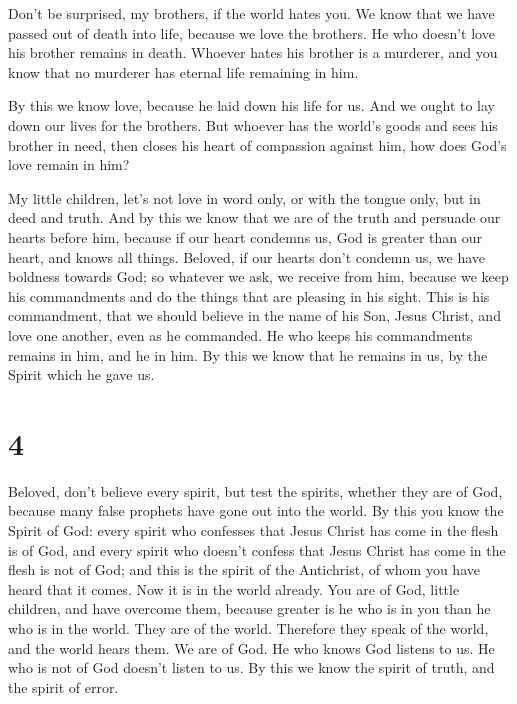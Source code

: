  Don't be surprised, my brothers, if the world hates you.
 We know that we have passed out of death into life,
because we love the brothers. He who doesn't love his brother remains in
death.  Whoever hates his brother is a murderer, and you
know that no murderer has eternal life remaining in him.

 By this we know love, because he laid down his life for
us. And we ought to lay down our lives for the brothers. 
But whoever has the world's goods and sees his brother in need, then
closes his heart of compassion against him, how does God's love remain
in him?

 My little children, let's not love in word only, or with
the tongue only, but in deed and truth.  And by this we
know that we are of the truth and persuade our hearts before him,
 because if our heart condemns us, God is greater than
our heart, and knows all things.  Beloved, if our hearts
don't condemn us, we have boldness towards God;  so
whatever we ask, we receive from him, because we keep his commandments
and do the things that are pleasing in his sight.  This
is his commandment, that we should believe in the name of his Son, Jesus
Christ, and love one another, even as he commanded.  He
who keeps his commandments remains in him, and he in him. By this we
know that he remains in us, by the Spirit which he gave us.

\hypertarget{section-3}{%
\section{4}\label{section-3}}

 Beloved, don't believe every spirit, but test the
spirits, whether they are of God, because many false prophets have gone
out into the world.  By this you know the Spirit of God:
every spirit who confesses that Jesus Christ has come in the flesh is of
God,  and every spirit who doesn't confess that Jesus
Christ has come in the flesh is not of God; and this is the spirit of
the Antichrist, of whom you have heard that it comes. Now it is in the
world already.  You are of God, little children, and have
overcome them, because greater is he who is in you than he who is in the
world.  They are of the world. Therefore they speak of the
world, and the world hears them.  We are of God. He who
knows God listens to us. He who is not of God doesn't listen to us. By
this we know the spirit of truth, and the spirit of error.

